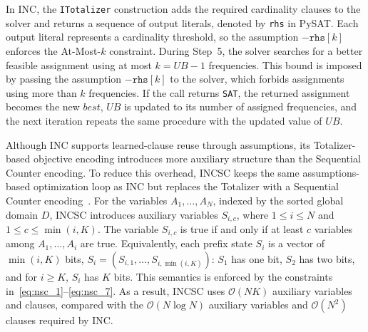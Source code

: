 \documentclass[letterpaper,journal]{IEEEtran}
\begin{document}
In INC, the \texttt{ITotalizer} construction adds the required cardinality clauses to the solver and returns a sequence of output literals, denoted by \texttt{rhs} in PySAT. Each output literal represents a cardinality threshold, so the assumption $-\texttt{rhs}[k]$ enforces the At-Most-$k$ constraint.
During Step~5, the solver searches for a better feasible assignment using at most $k=UB-1$ frequencies. This bound is imposed by passing the assumption $-\texttt{rhs}[k]$ to the solver, which forbids assignments using more than $k$ frequencies. If the call returns \texttt{SAT}, the returned assignment becomes the new $\mathit{best}$, $UB$ is updated to its number of assigned frequencies, and the next iteration repeats the same procedure with the updated value of $UB$.

Although INC supports learned-clause reuse through assumptions, its Totalizer-based objective encoding introduces more auxiliary structure than the Sequential Counter encoding.
To reduce this overhead, INCSC keeps the same assumptions-based optimization loop as INC but replaces the Totalizer with a Sequential Counter encoding~\cite{Sinz2005}. 
For the variables $A_1,\dots,A_N$, indexed by the sorted global domain $D$, INCSC introduces auxiliary variables $S_{i,c}$, where $1 \le i \le N$ and $1 \le c \le \min(i,K)$.
The variable $S_{i,c}$ is true if and only if at least $c$ variables among $A_1,\dots,A_i$ are true. Equivalently, each prefix state $S_i$ is a vector of $\min(i,K)$ bits, $S_i=(S_{i,1},\dots,S_{i,\min(i,K)})$: $S_1$ has one bit, $S_2$ has two bits, and for $i \ge K$, $S_i$ has $K$ bits. This semantics is enforced by the constraints in~\eqref{eq:nsc_1}--\eqref{eq:nsc_7}. 
As a result, INCSC uses $\mathcal{O}(NK)$ auxiliary variables and clauses, compared with the $\mathcal{O}(N \log N)$ auxiliary variables and $\mathcal{O}(N^2)$ clauses required by INC.
\end{document}
